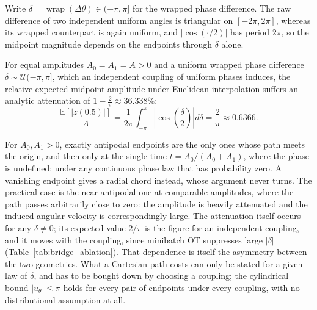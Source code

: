 Write $\delta = \operatorname{wrap}(\Delta\theta) \in (-\pi, \pi]$ for the wrapped phase difference. The raw difference of two independent uniform angles is triangular on $[-2\pi, 2\pi]$, whereas its wrapped counterpart is again uniform, and $|\cos(\cdot / 2)|$ has period $2\pi$, so the midpoint magnitude depends on the endpoints through $\delta$ alone.

\begin{proposition}
\label{prop:attenuation}
For equal amplitudes $A_0 = A_1 = A > 0$ and a uniform wrapped phase difference $\delta \sim \mathcal{U}(-\pi, \pi]$, which an independent coupling of uniform phases induces, the relative expected midpoint amplitude under Euclidean interpolation suffers an analytic attenuation of $1 - \frac{2}{\pi} \approx 36.338\%$:
\begin{equation}
    \frac{\mathbb{E}[|z(0.5)|]}{A} = \frac{1}{2\pi} \int_{-\pi}^{\pi} \left| \cos\left(\frac{\delta}{2}\right) \right| d\delta = \frac{2}{\pi} \approx 0.6366.
\end{equation}
\end{proposition}


For $A_0, A_1 > 0$, exactly antipodal endpoints are the only ones whose path meets the origin, and then only at the single time $t = A_0 / (A_0 + A_1)$, where the phase is undefined; under any continuous phase law that has probability zero. A vanishing endpoint gives a radial chord instead, whose argument never turns. The practical case is the near-antipodal one at comparable amplitudes, where the path passes arbitrarily close to zero: the amplitude is heavily attenuated and the induced angular velocity is correspondingly large. The attenuation itself occurs for any $\delta \neq 0$; its expected value $2/\pi$ is the figure for an independent coupling, and it moves with the coupling, since minibatch OT suppresses large $|\delta|$ (Table~\ref{tab:bridge_ablation}). That dependence is itself the asymmetry between the two geometries. What a Cartesian path costs can only be stated for a given law of $\delta$, and has to be bought down by choosing a coupling; the cylindrical bound $|u_\theta| \le \pi$ holds for every pair of endpoints under every coupling, with no distributional assumption at all.